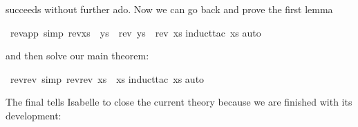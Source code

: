 \begin{isabellebody}
\begin{isamarkuptext}
\noindent
succeeds without further ado.
Now we can go back and prove the first lemma%
\end{isamarkuptext}%
\ rev{\isacharunderscore}app\ {\isacharbrackleft}simp{\isacharbrackright}{\isacharcolon}\ {\isachardoublequote}rev{\isacharparenleft}xs\ {\isacharat}\ ys{\isacharparenright}\ {\isacharequal}\ {\isacharparenleft}rev\ ys{\isacharparenright}\ {\isacharat}\ {\isacharparenleft}rev\ xs{\isacharparenright}{\isachardoublequote}\isanewline
{}induct{\isacharunderscore}tac\ xs{\isacharparenright}\isanewline
{}auto{\isacharparenright}%
\begin{isamarkuptext}%
\noindent
and then solve our main theorem:%
\end{isamarkuptext}%
\ rev{\isacharunderscore}rev\ {\isacharbrackleft}simp{\isacharbrackright}{\isacharcolon}\ {\isachardoublequote}rev{\isacharparenleft}rev\ xs{\isacharparenright}\ {\isacharequal}\ xs{\isachardoublequote}\isanewline
{}induct{\isacharunderscore}tac\ xs{\isacharparenright}\isanewline
{}auto{\isacharparenright}%
\begin{isamarkuptext}%
\noindent
The final  tells Isabelle to close the current theory because
we are finished with its development:%
\end{isamarkuptext}%
\isanewline
\end{isabellebody}%
